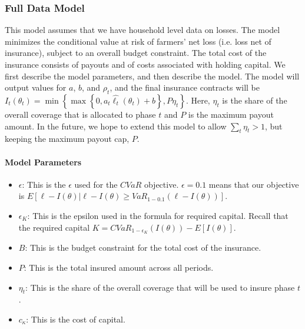 \documentclass[11pt]{article}
\begin{document}
    \subsubsection{Full Data Model}
    \label{full-data-model}
    This model assumes that we have household level data on losses. The model minimizes the conditional value at risk of farmers' net loss (i.e. loss net of insurance), subject to an overall budget constraint. The total cost of the insurance consists of payouts and of costs associated with holding capital. We first describe the model parameters, and then describe the model. The model will output values for $a$, $b$, and $\rho_t$, and the final insurance contracts will be $I_t(\theta_t) = \min \left \{\max \left \{0,a_t\hat{\ell_t}(\theta_t) + b \right \}, P\eta_t \right \}$. Here, $\eta_t$ is the share of the overall coverage that is allocated to phase $t$ and $P$ is the maximum payout amount. In the future, we hope to extend this model to allow $\sum_t \eta_t > 1$, but keeping the maximum payout cap, $P$.  
    \paragraph*{Model Parameters}
    \begin{itemize}
      \item $\epsilon$: This is the $\epsilon$ used for the $CVaR$ objective.  $\epsilon = 0.1$ means that our objective is $E[\ell - I(\theta)|\ell -I(\theta) \geq VaR_{1-0.1}\left ( \ell - I(\theta) \right )]$. 
      \item $\epsilon_K$: This is the epsilon used in the formula for required capital. Recall that the required capital $K = CVaR_{1-\epsilon_K}(I(\theta)) - E[I(\theta)]$.
      \item $B$: This is the budget constraint for the total cost of the insurance.
      \item $P$: This is the total insured amount across all periods. 
      \item $\eta_t$: This is the share of the overall coverage that will be used to insure phase $t$. 
      \item $c_{\kappa}$: This is the cost of capital. 
    \end{itemize}
    
\end{document}

